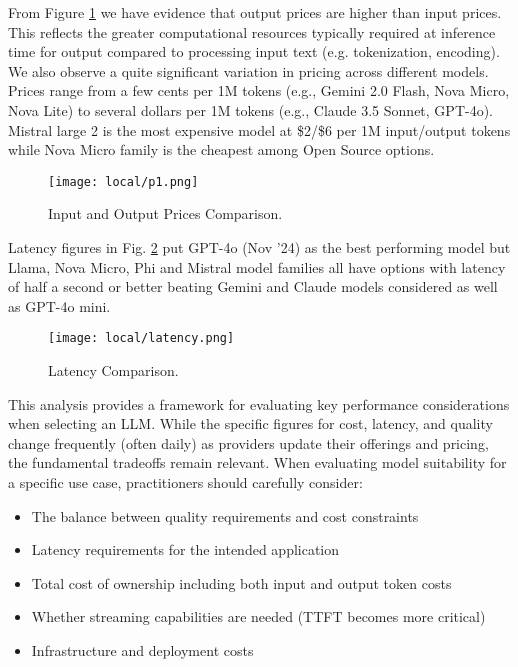From Figure \ref{fig:p1} we have evidence that output prices are higher than input prices. This reflects the greater computational resources typically required at inference time for output compared to processing input text (e.g. tokenization, encoding). We also observe a quite significant variation in pricing across different models. Prices range from a few cents per 1M tokens (e.g., Gemini 2.0 Flash, Nova Micro, Nova Lite) to several dollars per 1M tokens (e.g., Claude 3.5 Sonnet, GPT-4o). Mistral large 2 is the most expensive model at \$2/\$6 per 1M input/output tokens while Nova Micro family is the cheapest among Open Source options.

\begin{figure}[H]
\centering
\texttt{[image: local/p1.png]}
\caption{Input and Output Prices Comparison.}
\label{fig:p1}
\end{figure}

Latency figures in Fig. \ref{fig:latency} put GPT-4o (Nov '24) as the best performing model but Llama, Nova Micro, Phi and Mistral model families all have options with latency of half a second or better beating Gemini and Claude models considered as well as GPT-4o mini.

\begin{figure}[H]
\centering
\texttt{[image: local/latency.png]}
\caption{Latency Comparison.}
\label{fig:latency}
\end{figure}

This analysis provides a framework for evaluating key performance considerations when selecting an LLM. While the specific figures for cost, latency, and quality change frequently (often daily) as providers update their offerings and pricing, the fundamental tradeoffs remain relevant. When evaluating model suitability for a specific use case, practitioners should carefully consider:

\begin{itemize}
    \item The balance between quality requirements and cost constraints
    \item Latency requirements for the intended application
    \item Total cost of ownership including both input and output token costs
    \item Whether streaming capabilities are needed (TTFT becomes more critical)
    \item Infrastructure and deployment costs
\end{itemize}

